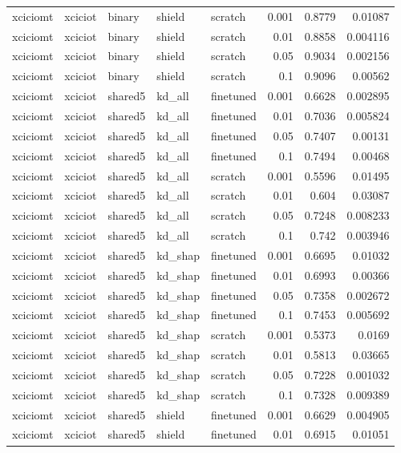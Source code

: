 \begin{table}
\begin{tabular}{lllllrrr}
xciciomt & xciciot & binary & shield & scratch & 0.001 & 0.8779 & 0.01087 \\
xciciomt & xciciot & binary & shield & scratch & 0.01 & 0.8858 & 0.004116 \\
xciciomt & xciciot & binary & shield & scratch & 0.05 & 0.9034 & 0.002156 \\
xciciomt & xciciot & binary & shield & scratch & 0.1 & 0.9096 & 0.00562 \\
xciciomt & xciciot & shared5 & kd_all & finetuned & 0.001 & 0.6628 & 0.002895 \\
xciciomt & xciciot & shared5 & kd_all & finetuned & 0.01 & 0.7036 & 0.005824 \\
xciciomt & xciciot & shared5 & kd_all & finetuned & 0.05 & 0.7407 & 0.00131 \\
xciciomt & xciciot & shared5 & kd_all & finetuned & 0.1 & 0.7494 & 0.00468 \\
xciciomt & xciciot & shared5 & kd_all & scratch & 0.001 & 0.5596 & 0.01495 \\
xciciomt & xciciot & shared5 & kd_all & scratch & 0.01 & 0.604 & 0.03087 \\
xciciomt & xciciot & shared5 & kd_all & scratch & 0.05 & 0.7248 & 0.008233 \\
xciciomt & xciciot & shared5 & kd_all & scratch & 0.1 & 0.742 & 0.003946 \\
xciciomt & xciciot & shared5 & kd_shap & finetuned & 0.001 & 0.6695 & 0.01032 \\
xciciomt & xciciot & shared5 & kd_shap & finetuned & 0.01 & 0.6993 & 0.00366 \\
xciciomt & xciciot & shared5 & kd_shap & finetuned & 0.05 & 0.7358 & 0.002672 \\
xciciomt & xciciot & shared5 & kd_shap & finetuned & 0.1 & 0.7453 & 0.005692 \\
xciciomt & xciciot & shared5 & kd_shap & scratch & 0.001 & 0.5373 & 0.0169 \\
xciciomt & xciciot & shared5 & kd_shap & scratch & 0.01 & 0.5813 & 0.03665 \\
xciciomt & xciciot & shared5 & kd_shap & scratch & 0.05 & 0.7228 & 0.001032 \\
xciciomt & xciciot & shared5 & kd_shap & scratch & 0.1 & 0.7328 & 0.009389 \\
xciciomt & xciciot & shared5 & shield & finetuned & 0.001 & 0.6629 & 0.004905 \\
xciciomt & xciciot & shared5 & shield & finetuned & 0.01 & 0.6915 & 0.01051 \\

\end{tabular}
\end{table}
